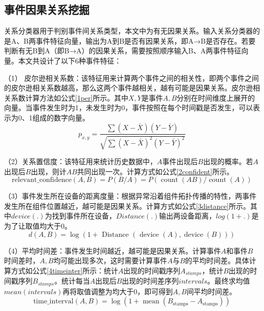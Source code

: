 
\subsection{事件因果关系挖掘}
关系分类器用于判别事件间关系类型，本文中为有无因果关系。输入关系分类器的是A、B两事件特征向量，输出为A到B是否有因果关系，即A→B是否存在。若要判断有无B到A（即B→A）的因果关系，需要按照顺序输入B、A两事件特征向量。本文共设计了以下6种事件特征：

（1） 皮尔逊相关系数：该特征用来计算两个事件之间的相关性，即两个事件之间的皮尔逊相关系数越高，那么这两个事件越相关，越有可能是因果关系。皮尔逊相关系数计算方法如公式\ref{1per}所示。其中$X,Y$是事件$A,B$分别在时间维度上展开的向量。当事件发生时为1，未发生时为0，事件按照在每个时间戳是否发生，可以表示为0、1组成的数字向量。
\begin{equation}
    p_{x, y}=\frac{\sum(X-\bar{X})(Y-\bar{Y})}{\sqrt{\sum(X-\bar{X})^{2}(Y-\bar{Y})^{2}}}\label{1per}
\end{equation}

（2）关系置信度：该特征用来统计历史数据中，$A$事件出现后$B$出现的概率。若$A$出现后$B$出现，则计$AB$共同出现一次。计算方式如公式\ref{2confident}所示。
\begin{equation}
    \operatorname{{ relevant }\_{confidence }}(A, B)=P(B/A)=P(\operatorname{count}(A B) / \operatorname{count}(A))\label{2confident}
\end{equation}

（3）事件发生所在设备的距离度量：根据异常沿着组件拓扑传播的特性，两事件发生所在组件位置越近，越可能是因果关系。计算方式如公式\ref{3distance}所示。其中$device(.)$为找到事件所在设备，$Distance(.)$输出两设备距离，$log(1+.)$是为了让取值均大于0。
\begin{equation}
    d(A, B)=\log (1+\text { Distance }(\text { device }(A), \operatorname{device}(B)))\label{3distance}
\end{equation}

（4）平均时间差：事件发生时间越近，越可能是因果关系。计算事件$A$和事件$B$时间差时，$A,B$均可能出现多次，这时需要计算事件$A$与$B$的平均时间差。具体计算方式如公式\ref{4timeinter}所示：统计$A$出现的时间戳序列$A_{stamps}$，统计$B$出现的时间戳序列$B_{stamps}$。统计每当$A$出现后$B$出现的时间差序列$intervals$。最终求均值$mean(intervals)$再将取值调整为均大于0，即可得到$A,B$间平均时间差。
\begin{equation}
    \operatorname{\text{time}\_{interval}}\left ( A,B \right ) =  \log\left ({1+  \operatorname{mean} \left ( B_\text{stamps} - A_\text{stamps} \right ) } \right )\label{4timeinter}
\end{equation}


